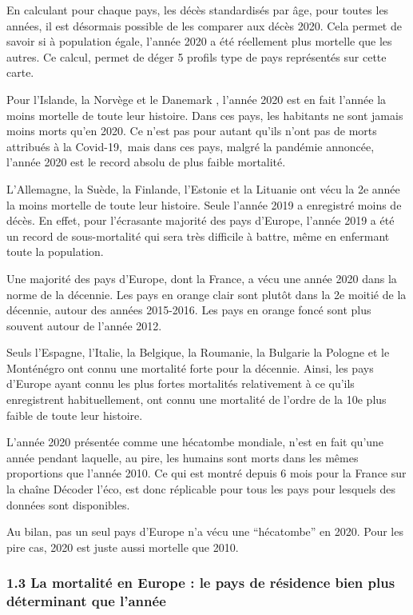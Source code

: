 \documentclass[
]{article}
\begin{document}
En calculant pour chaque pays, les décès standardisés par âge, pour
toutes les années, il est désormais possible de les comparer aux décès
2020. Cela permet de savoir si à population égale, l'année 2020 a été
réellement plus mortelle que les autres. Ce calcul, permet de déger 5
profils type de pays représentés sur cette carte.

Pour l'Islande, la Norvège et le Danemark , l'année 2020 est en fait
l'année la moins mortelle de toute leur histoire. Dans ces pays, les
habitants ne sont jamais moins morts qu'en 2020. Ce n'est pas pour
autant qu'ils n'ont pas de morts attribués à la Covid-19,~mais dans ces
pays, malgré la pandémie annoncée, l'année 2020 est le record absolu de
plus faible mortalité.

L'Allemagne, la Suède, la Finlande, l'Estonie et la Lituanie ont vécu la
2e année la moins mortelle de toute leur histoire. Seule l'année 2019 a
enregistré moins de décès. En effet, pour l'écrasante majorité des pays
d'Europe, l'année 2019 a été un record de sous-mortalité qui sera très
difficile à battre, même en enfermant toute la population.

Une majorité des pays d'Europe, dont la France, a vécu une année 2020
dans la norme de la décennie. Les pays en orange clair sont plutôt dans
la 2e moitié de la décennie, autour des années 2015-2016. Les pays en
orange foncé sont plus souvent autour de l'année 2012.

Seuls l'Espagne, l'Italie, la Belgique, la Roumanie, la Bulgarie la
Pologne et le Monténégro ont connu une mortalité forte pour la décennie.
Ainsi, les pays d'Europe ayant connu les plus fortes mortalités
relativement à ce qu'ils enregistrent habituellement, ont connu une
mortalité de l'ordre de la 10e plus faible de toute leur histoire.

L'année 2020 présentée comme une hécatombe mondiale, n'est en fait
qu'une année pendant laquelle, au pire, les humains sont morts dans les
mêmes proportions que l'année 2010. Ce qui est montré depuis 6 mois pour
la France sur la chaîne Décoder l'éco, est donc réplicable pour tous les
pays pour lesquels des données sont disponibles.

Au bilan, pas un seul pays d'Europe n'a vécu une ``hécatombe'' en 2020.
Pour les pire cas, 2020 est juste aussi mortelle que 2010.

\hypertarget{la-mortalituxe9-en-europe-le-pays-de-ruxe9sidence-bien-plus-duxe9terminant-que-lannuxe9e}{%
\subsubsection{1.3 La mortalité en Europe : le pays de résidence bien
plus déterminant que
l'année}\label{la-mortalituxe9-en-europe-le-pays-de-ruxe9sidence-bien-plus-duxe9terminant-que-lannuxe9e}}
\end{document}
